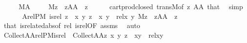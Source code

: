 \begin{isabellebody}
%
\isadelimproof
%
\endisadelimproof
%
\isatagproof
{}\isamarkupfalse%
\ {\isacharminus}{\kern0pt}\isanewline
\ \ \isamarkupfalse%
\ {\isacartoucheopen}M{\isacharparenleft}{\kern0pt}A{\isacharparenright}{\kern0pt}{\isacartoucheclose}\ \isanewline
\ \ \isamarkupfalse%
\ {\isachardoublequoteopen}M{\isacharparenleft}{\kern0pt}z{\isacharparenright}{\kern0pt}{\isachardoublequoteclose}\ \ {\isachardoublequoteopen}z{\isasymin}A{\isasymtimes}A{\isachardoublequoteclose}\ \ z\isanewline
\ \ \ \ \isamarkupfalse%
\ cartprod{\isacharunderscore}{\kern0pt}closed\ transM{\isacharbrackleft}{\kern0pt}of\ z\ {\isachardoublequoteopen}A{\isasymtimes}A{\isachardoublequoteclose}{\isacharbrackright}{\kern0pt}\ that\ \isamarkupfalse%
\ simp\isanewline
\ \ \isamarkupfalse%
\isanewline
\ \ \isamarkupfalse%
\ A{\isacharcolon}{\kern0pt}{\isachardoublequoteopen}relP{\isacharparenleft}{\kern0pt}M{\isacharcomma}{\kern0pt}\ is{\isacharunderscore}{\kern0pt}rel{\isacharcomma}{\kern0pt}\ z{\isacharparenright}{\kern0pt}\ {\isasymlongleftrightarrow}\ {\isacharparenleft}{\kern0pt}{\isasymexists}x\ y{\isachardot}{\kern0pt}\ z\ {\isacharequal}{\kern0pt}\ {\isasymlangle}x{\isacharcomma}{\kern0pt}\ y{\isasymrangle}\ {\isasymand}\ rel{\isacharparenleft}{\kern0pt}x{\isacharcomma}{\kern0pt}\ y{\isacharparenright}{\kern0pt}{\isacharparenright}{\kern0pt}{\isachardoublequoteclose}\ {\isachardoublequoteopen}M{\isacharparenleft}{\kern0pt}z{\isacharparenright}{\kern0pt}{\isachardoublequoteclose}\ \ {\isachardoublequoteopen}z{\isasymin}A{\isasymtimes}A{\isachardoublequoteclose}\ \ z\isanewline
\ \ \ \ \isamarkupfalse%
\ that\ is{\isacharunderscore}{\kern0pt}related{\isacharunderscore}{\kern0pt}abs{\isacharbrackleft}{\kern0pt}of\ rel\ is{\isacharunderscore}{\kern0pt}rel{\isacharcomma}{\kern0pt}OF\ assms{\isacharparenleft}{\kern0pt}{}{\isacharparenright}{\kern0pt}{\isacharbrackright}{\kern0pt}\ \isamarkupfalse%
\ auto\isanewline
\ \ \isamarkupfalse%
\isanewline
\ \ \isamarkupfalse%
\ {\isachardoublequoteopen}Collect{\isacharparenleft}{\kern0pt}A{\isasymtimes}A{\isacharcomma}{\kern0pt}relP{\isacharparenleft}{\kern0pt}M{\isacharcomma}{\kern0pt}is{\isacharunderscore}{\kern0pt}rel{\isacharparenright}{\kern0pt}{\isacharparenright}{\kern0pt}\ {\isacharequal}{\kern0pt}\ Collect{\isacharparenleft}{\kern0pt}A{\isasymtimes}A{\isacharcomma}{\kern0pt}{\isasymlambda}z{\isachardot}{\kern0pt}\ {\isacharparenleft}{\kern0pt}{\isasymexists}x\ y{\isachardot}{\kern0pt}\ z\ {\isacharequal}{\kern0pt}\ {\isasymlangle}x{\isacharcomma}{\kern0pt}y{\isasymrangle}\ {\isasymand}\ rel{\isacharparenleft}{\kern0pt}x{\isacharcomma}{\kern0pt}y{\isacharparenright}{\kern0pt}{\isacharparenright}{\kern0pt}{\isacharparenright}{\kern0pt}{\isachardoublequoteclose}\isanewline

\end{isabellebody}
